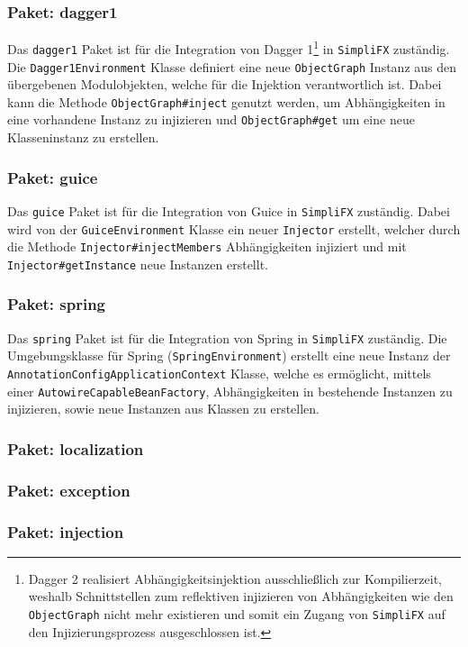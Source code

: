 \subsubsection{Paket: dagger1}
Das \texttt{dagger1} Paket ist für die Integration von Dagger 1\footnote{Dagger 2 realisiert Abhängigkeitsinjektion ausschließlich zur Kompilierzeit, weshalb Schnittstellen zum reflektiven injizieren von Abhängigkeiten wie den \texttt{ObjectGraph} nicht mehr existieren und somit ein Zugang von \texttt{SimpliFX} auf den Injizierungsprozess ausgeschlossen ist.} in \texttt{SimpliFX} zuständig. Die \texttt{Dagger1Environment} Klasse definiert eine neue \texttt{ObjectGraph} Instanz aus den übergebenen Modulobjekten, welche für die Injektion verantwortlich ist. Dabei kann die Methode \texttt{ObjectGraph\#inject} genutzt werden, um Abhängigkeiten in eine vorhandene Instanz zu injizieren und \texttt{ObjectGraph\#get} um eine neue Klasseninstanz zu erstellen. 
\subsubsection{Paket: guice}
Das \texttt{guice} Paket ist für die Integration von Guice in \texttt{SimpliFX} zuständig. Dabei wird von der \texttt{GuiceEnvironment} Klasse ein neuer \texttt{Injector} erstellt, welcher durch die Methode \texttt{Injector\#injectMembers} Abhängigkeiten injiziert und mit \texttt{Injector\#getInstance} neue Instanzen erstellt.
\subsubsection{Paket: spring}
Das \texttt{spring} Paket ist für die Integration von Spring in \texttt{SimpliFX} zuständig.
Die Umgebungsklasse für Spring (\texttt{SpringEnvironment}) erstellt eine neue Instanz der \texttt{AnnotationConfigApplicationContext} Klasse, welche es ermöglicht, mittels einer \texttt{AutowireCapableBeanFactory}, Abhängigkeiten in bestehende Instanzen zu injizieren, sowie neue Instanzen aus Klassen zu erstellen.
\subsubsection{Paket: localization}
\subsubsection{Paket: exception}
\subsubsection{Paket: injection}
